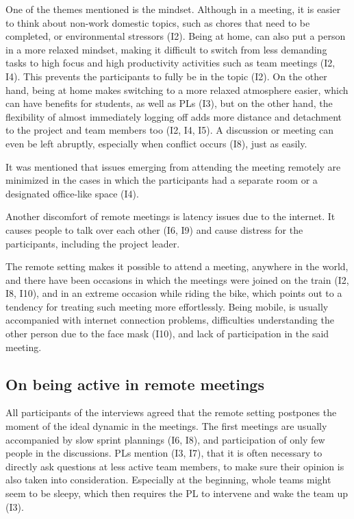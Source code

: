 One of the themes mentioned is the mindset. Although in a meeting, it is easier to think about non-work domestic topics, such as chores that need to be completed, or environmental stressors (I2). Being at home, can also put a person in a more relaxed mindset, making it difficult to switch from less demanding tasks to high focus and high productivity activities such as team meetings (I2, I4). This prevents the participants to fully be in the topic (I2). On the other hand, being at home makes switching to a more relaxed atmosphere easier, which can have benefits for students, as well as PLs (I3), but on the other hand, the flexibility of almost immediately logging off adds more distance and detachment to the project and team members too (I2, I4, I5). A discussion or meeting can even be left abruptly, especially when conflict occurs (I8), just as easily. 

It was mentioned that issues emerging from attending the meeting remotely are minimized in the cases in which the participants had a separate room or a designated office-like space (I4).

Another discomfort of remote meetings is latency issues due to the internet. It causes people to talk over each other (I6, I9) and cause distress for the participants, including the project leader. 

The remote setting makes it possible to attend a meeting, anywhere in the world, and there have been occasions in which the meetings were joined on the train (I2, I8,  I10), and in an extreme occasion while riding the bike, which points out to a tendency for treating such meeting more effortlessly. Being mobile, is usually accompanied with internet connection problems, difficulties understanding the other person due to the face mask (I10), and lack of participation in the said meeting.  

\subsection{On being active in remote meetings}

All participants of the interviews agreed that the remote setting postpones the moment of the ideal dynamic in the meetings. The first meetings are usually accompanied by slow sprint plannings (I6, I8), and participation of only few people in the discussions. PLs mention (I3, I7), that it is often necessary to directly ask questions at less active team members, to make sure their opinion is also taken into consideration. Especially at the beginning, whole teams might seem to be sleepy, which then requires the PL to intervene and wake the team up (I3).

